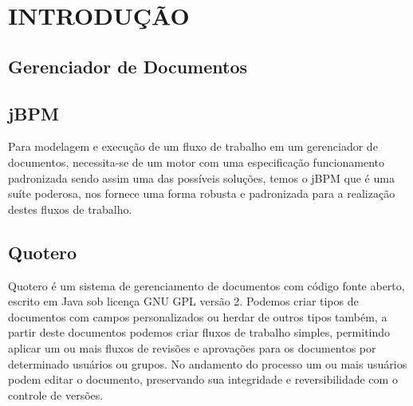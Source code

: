 \documentclass{abnt}
\begin{document}






\capa

\folhaderosto

\tableofcontents


\chapter{INTRODUÇÃO}

	\section{Gerenciador de Documentos}
	
					
	\section{jBPM}
	
		Para modelagem e execução de um fluxo de trabalho em um gerenciador de documentos, necessita-se de um motor com uma
		especificação funcionamento padronizada sendo assim uma das possíveis soluções, temos o jBPM que é uma suíte
		poderosa, nos fornece uma forma robusta e padronizada para a realização destes fluxos de trabalho.
						
		
		
		
	\clearpage	
	\section{Quotero}
	
	Quotero é um sistema de gerenciamento de documentos com código fonte aberto, escrito em Java sob licença GNU GPL
	versão 2. Podemos criar tipos de documentos com campos personalizados ou herdar de outros tipos também, a partir deste
	documentos podemos criar fluxos de trabalho simples, permitindo aplicar um ou mais fluxos de revisões e aprovações para
	os documentos por determinado usuários ou grupos. No andamento do processo um ou mais usuários podem editar o
	documento, preservando sua integridade e reversibilidade com o controle de versões.
	
\end{document}
